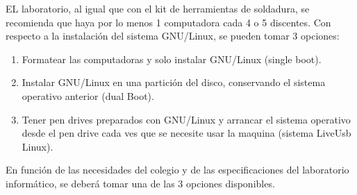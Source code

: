 EL laboratorio, al igual que con el kit de herramientas de soldadura, se recomienda que haya por lo menos 1 computadora cada 4 o 5 discentes. Con respecto a la instalación del sistema GNU/Linux, se pueden tomar 3 opciones:

\begin{enumerate}
  \item Formatear las computadoras y solo instalar GNU/Linux (single boot).
  \item Instalar GNU/Linux en una partición del disco, conservando el sistema operativo anterior (dual Boot).
  \item Tener pen drives preparados con GNU/Linux y arrancar el sistema operativo desde el pen drive cada ves que se necesite usar la maquina (sistema LiveUsb Linux).
\end{enumerate}

En función de las necesidades del colegio y de las especificaciones del laboratorio informático, se deberá tomar una de las 3 opciones disponibles.


 
